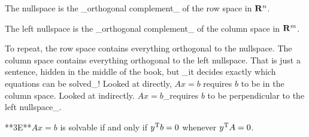 The nullspace is the _orthogonal complement_ of the row space in \({\bf R}^{n}\).

The left nullspace is the _orthogonal complement_ of the column space in \({\bf R}^{m}\).

To repeat, the row space contains everything orthogonal to the nullspace. The column space contains everything orthogonal to the left nullspace. That is just a sentence, hidden in the middle of the book, but _it decides exactly which equations can be solved_! Looked at directly, \(Ax=b\) requires \(b\) to be in the column space. Looked at indirectly. \(Ax=b\)_requires \(b\) to be perpendicular to the left nullspace_.

**3E**\(Ax=b\) is solvable if and only if \(y^{\rm T}b=0\) whenever \(y^{\rm T}A=0\).

 